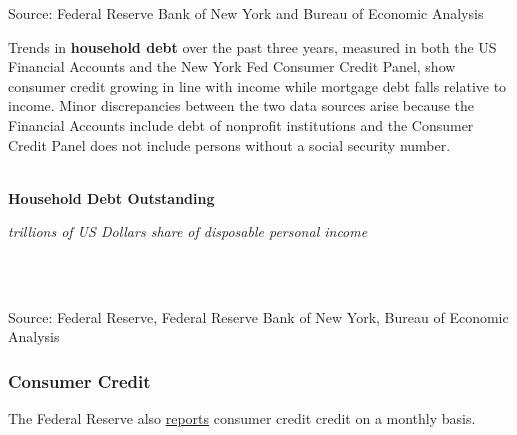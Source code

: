 \documentclass{report}
\begin{document}
{{{\begin{minipage}{0.76\textwidth}


\vspace{1mm}

\footnotesize{Source: Federal Reserve Bank of New York and Bureau of Economic Analysis}


\end{minipage}

\newpage


\begin{minipage}{0.76\textwidth}

\small Trends in \textbf{household debt} over the past three years, measured in both the US Financial Accounts and the New York Fed Consumer Credit Panel, show consumer credit growing in line with income while mortgage debt falls relative to income. Minor discrepancies between the two data sources arise because the Financial Accounts include debt of nonprofit institutions and the Consumer Credit Panel does not include persons without a social security number.\\

 \\

 

\vspace{3mm}

\normalsize \textbf{Household Debt Outstanding}

\footnotesize{\textit{trillions of US Dollars \hspace{46mm} share of disposable personal income}

 \setlength{\tabcolsep}{3.1pt} \color{black!90}
		{\renewcommand{\arraystretch}{1.54}
		 \begin{tabular}{p{36mm} R{11.8mm} R{11.8mm}  R{8.0mm} R{7.4mm} R{7.4mm} 
		   R{7.4mm} R{7.4mm}}
			 
			 \hline
		\end{tabular}
		}	\\}
		
\footnotesize{Source: Federal Reserve, Federal Reserve Bank of New York, Bureau of Economic Analysis}
\end{minipage}
\newpage
\begin{minipage}{0.76\textwidth}
\subsubsection*{\color{black!70} \seriffont Consumer Credit}

\small The Federal Reserve also \href{https://www.federalreserve.gov/releases/g19/current/default.htm}{reports} consumer credit credit on a monthly basis. \\


\end{minipage}}}}
\end{document}
